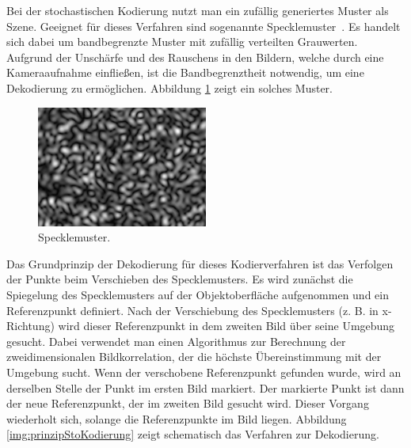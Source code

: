 Bei der stochastischen Kodierung nutzt man ein zufällig generiertes Muster als Szene.
Geeignet für dieses Verfahren sind sogenannte \glqq Specklemuster\grqq ~\cite{specklePattern}.
Es handelt sich dabei um bandbegrenzte Muster mit zufällig verteilten Grauwerten.
Aufgrund der Unschärfe und des Rauschens in den Bildern, welche durch eine Kameraaufnahme einfließen, ist die Bandbegrenztheit notwendig, um eine Dekodierung zu ermöglichen.
Abbildung \ref{img:speckleMuster} zeigt ein solches Muster.
%
\begin{figure}[H]
	\centering
	\includegraphics[frame,width=0.5\textwidth]{02_grundlagenDerDeflektometrie/rekonstruktion/stochastischeKodierung/figures/speckleMuster}
	\caption[Specklemuster]{Specklemuster.}
	\label{img:speckleMuster}
\end{figure}
%
\noindent
Das Grundprinzip der Dekodierung für dieses Kodierverfahren ist das Verfolgen der Punkte beim Verschieben des Specklemusters.
Es wird zunächst die Spiegelung des Specklemusters auf der Objektoberfläche aufgenommen und ein Referenzpunkt definiert.
Nach der Verschiebung des Specklemusters (z. B. in x-Richtung) wird dieser Referenzpunkt in dem zweiten Bild über seine Umgebung gesucht.
Dabei verwendet man einen Algorithmus zur Berechnung der zweidimensionalen Bildkorrelation, der die höchste Übereinstimmung mit der Umgebung sucht.
Wenn der verschobene Referenzpunkt gefunden wurde, wird an derselben Stelle der Punkt im ersten Bild markiert.
Der markierte Punkt ist dann der neue Referenzpunkt, der im zweiten Bild gesucht wird.
Dieser Vorgang wiederholt sich, solange die Referenzpunkte im Bild liegen.
Abbildung \ref{img:prinzipStoKodierung} zeigt schematisch das Verfahren zur Dekodierung.
%
